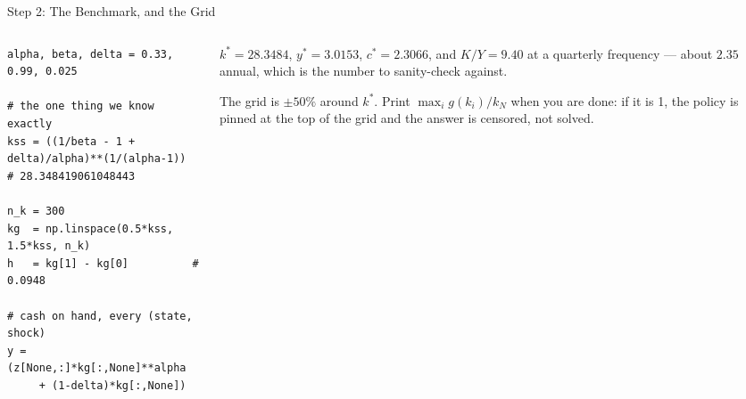 \begin{frame}[fragile]{Step 2: The Benchmark, and the Grid}
\begin{columns}[T]
\begin{column}{0.53\textwidth}
\begin{lstlisting}
alpha, beta, delta = 0.33, 0.99, 0.025

# the one thing we know exactly
kss = ((1/beta - 1 + delta)/alpha)**(1/(alpha-1))
# 28.348419061048443

n_k = 300
kg  = np.linspace(0.5*kss, 1.5*kss, n_k)
h   = kg[1] - kg[0]          # 0.0948

# cash on hand, every (state, shock)
y = (z[None,:]*kg[:,None]**alpha
     + (1-delta)*kg[:,None])
\end{lstlisting}
\end{column}
\begin{column}{0.44\textwidth}
\small
$k^{*}=28.3484$, $y^{*}=3.0153$, $c^{*}=2.3066$, and $K/Y=9.40$ at a quarterly frequency --- about $2.35$ annual, which is the number to sanity-check against.
\medskip
\begin{cautionbox}\footnotesize
The grid is $\pm50\%$ around $k^{*}$. Print $\max_i g(k_i)/k_N$ when you are done: if it is 1, the policy is pinned at the top of the grid and the answer is censored, not solved.
\end{cautionbox}
\end{column}
\end{columns}
\end{frame}

